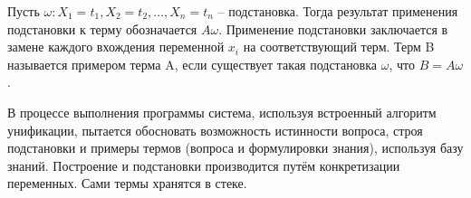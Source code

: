 \documentclass[12pt]{report}
\begin{document}
Пусть $\omega: {X}_{1} = {t}_{1} , {X}_{2} = {t}_{2},… , {X}_{n} = {t}_{n}$ -- подстановка. Тогда результат применения подстановки к терму обозначается $A\omega$. Применение подстановки заключается в замене каждого вхождения переменной $x_i$ на соответствующий терм. Терм B называется примером терма A, если существует такая подстановка $\omega$, что $B = A\omega$.

В процессе выполнения программы система, используя встроенный алгоритм унификации, пытается обосновать возможность истинности вопроса, строя подстановки и примеры термов (вопроса и формулировки знания), используя базу знаний. Построение и подстановки производится путём конкретизации переменных. Сами термы хранятся в стеке.














	
\end{document}
